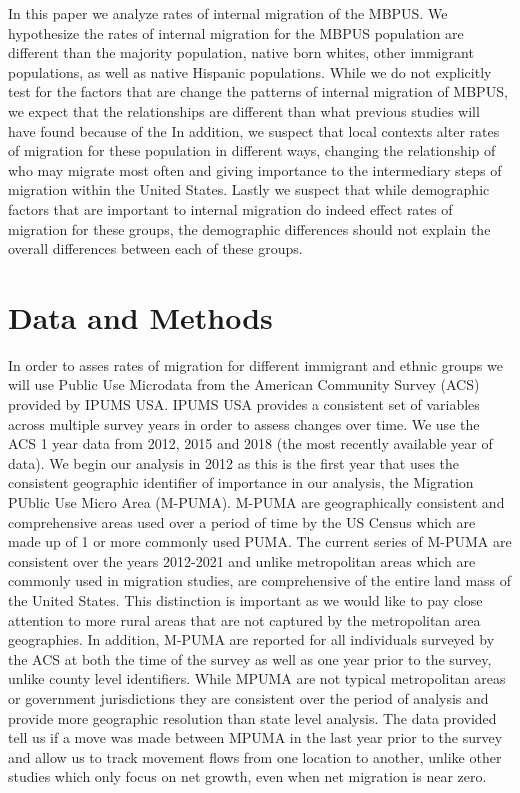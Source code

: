\documentclass[fleqn,12pt]{olplainarticle}
\begin{document}
In this paper we analyze rates of internal migration of the MBPUS.
We hypothesize the rates of internal migration for the MBPUS population are different than the majority population, native born whites, other immigrant populations, as well as native Hispanic populations.
While we do not explicitly test for the factors that are change the patterns of internal migration of MBPUS, we expect that the relationships are different than what previous studies will have found because of the 
In addition, we suspect that local contexts alter rates of migration for these population in different ways, changing the relationship of who may migrate most often and giving importance to the intermediary steps of migration within the United States.
Lastly we suspect that while demographic factors that are important to internal migration do indeed effect rates of migration for these groups, the demographic differences should not explain the overall differences between each of these groups.  

\section*{Data and Methods}

In order to asses rates of migration for different immigrant and ethnic groups we will use Public Use Microdata from the American Community Survey (ACS) provided by IPUMS USA.
IPUMS USA provides a consistent set of variables across multiple survey years in order to assess changes over time.
We use the ACS 1 year data from 2012, 2015 and 2018 (the most recently available year of data). 
We begin our analysis in 2012 as this is the first year that uses the consistent geographic identifier of importance in our analysis, the Migration PUblic Use Micro Area (M-PUMA).
M-PUMA are geographically consistent and comprehensive areas used over a period of time by the US Census which are made up of 1 or more commonly used PUMA.
The current series of M-PUMA are consistent over the years 2012-2021 and unlike metropolitan areas which are commonly used in migration studies, are comprehensive of the entire land mass of the United States.
This distinction is important as we would like to pay close attention to more rural areas that are not captured by the metropolitan area geographies.
In addition, M-PUMA are reported for all individuals surveyed by the ACS at both the time of the survey as well as one year prior to the survey, unlike county level identifiers.
While MPUMA are not typical metropolitan areas or government jurisdictions they are consistent over the period of analysis and provide more geographic resolution than state level analysis.
The data provided tell us if a move was made between MPUMA in the last year prior to the survey and allow us to track movement flows from one location to another, unlike other studies which only focus on net growth, even when net migration is near zero. 
\end{document}
